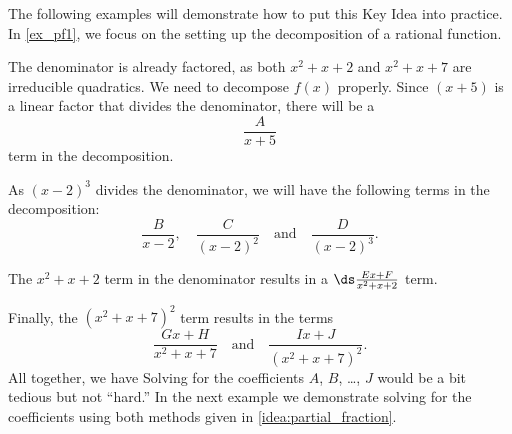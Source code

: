 The following examples will demonstrate how to put this Key Idea into practice. In \autoref{ex_pf1}, we focus on the setting up the decomposition of a rational function.

{The denominator is already factored, as both $x^2+x+2$ and $x^2+x+7$ are irreducible quadratics. We need to decompose $f(x)$ properly. Since $(x+5)$ is a linear factor that divides the denominator, there will be a
\[\frac{A}{x+5}\]
term in the decomposition.

As $(x-2)^3$ divides the denominator, we will have the following terms in the decomposition:
$$\frac{B}{x-2},\quad \frac{C}{(x-2)^2}\quad \text{and}\quad \frac{D}{(x-2)^3}.$$

The $x^2+x+2$ term in the denominator results in a $\ds\frac{Ex+F}{x^2+x+2}$ term.

Finally, the $(x^2+x+7)^2$ term results in the terms $$\frac{Gx+H}{x^2+x+7}\quad \text{and}\quad \frac{Ix+J}{(x^2+x+7)^2}.$$
All together, we have
Solving for the coefficients $A$, $B$, \ldots, $J$ would be a bit tedious but not ``hard.''  In the next example we demonstrate solving for the coefficients using both methods given in \autoref{idea:partial_fraction}.}


